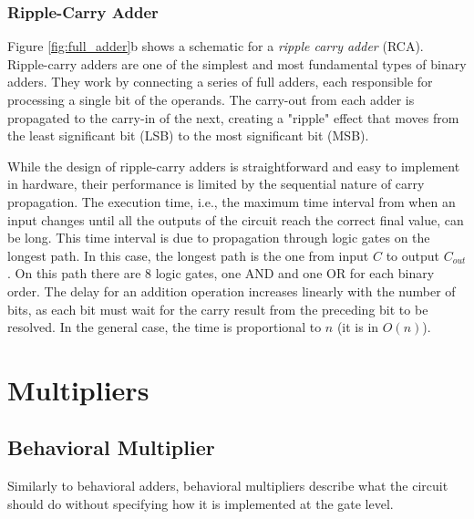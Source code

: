 
\subsubsection{Ripple-Carry Adder} \label{sec:ripple-carry-adder}
Figure \ref{fig:full_adder}b shows a schematic for a \textit{ripple carry adder} (RCA). Ripple-carry adders are one of the simplest and most fundamental types of binary adders. They work by connecting a series of full adders, each responsible for processing a single bit of the operands. The carry-out from each adder is propagated to the carry-in of the next, creating a "ripple" effect that moves from the least significant bit (LSB) to the most significant bit (MSB). 

While the design of ripple-carry adders is straightforward and easy to implement in hardware, their performance is limited by the sequential nature of carry propagation. The execution time, i.e., the maximum time interval from when an input changes until all the outputs of the circuit reach the correct final value, can be long. This time interval is due to propagation through logic gates on the longest path. In this case, the longest path is the one from input $C$ to output $C_{out}$. On this path there are 8 logic gates, one AND and one OR for each binary order. The delay for an addition operation increases linearly with the number of bits, as each bit must wait for the carry result from the preceding bit to be resolved. In the general case, the time is proportional to $n$ (it is in $O(n)$). 

\section{Multipliers}

\subsection{Behavioral Multiplier}
Similarly to behavioral adders, behavioral multipliers describe what the circuit should do without specifying how it is implemented at the gate level. 

